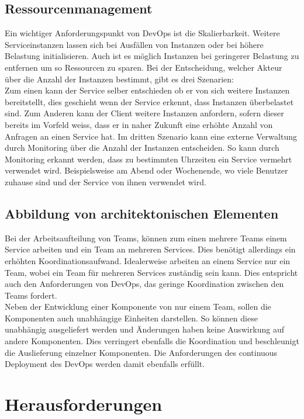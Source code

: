 \subsection{Ressourcenmanagement}

Ein wichtiger Anforderungspunkt von DevOps ist die Skalierbarkeit. Weitere Serviceinstanzen lassen sich bei Ausfällen von Instanzen oder bei höhere Belastung initialisieren. Auch ist es möglich Instanzen bei geringerer Belastung zu entfernen um so Ressourcen zu sparen. Bei der Entscheidung, welcher Akteur über die Anzahl der Instanzen bestimmt, gibt es drei Szenarien:\\
Zum einen kann der Service selber entschieden ob er von sich weitere Instanzen bereitstellt, dies geschieht wenn der Service erkennt, dass Instanzen überbelastet sind. Zum Anderen kann der Client weitere Instanzen anfordern, sofern dieser bereits im Vorfeld weiss, dass er in naher Zukunft eine erhöhte Anzahl von Anfragen an einen Service hat. Im dritten Szenario kann eine externe Verwaltung durch Monitoring über die Anzahl der Instanzen entscheiden. So kann durch Monitoring erkannt werden, dass zu bestimmten Uhrzeiten ein Service vermehrt verwendet wird. Beispielsweise am Abend oder Wochenende, wo viele Benutzer zuhause sind und der Service von ihnen verwendet wird. 

\subsection{Abbildung von architektonischen Elementen}

Bei der Arbeitsaufteilung von Teams, können zum einen mehrere Teams einem Service arbeiten und ein Team an mehreren Services. Dies benötigt allerdings ein erhöhten Koordinationsaufwand. Idealerweise arbeiten an einem Service nur ein Team, wobei ein Team für mehreren Services zuständig sein kann. Dies entspricht auch den Anforderungen von DevOps, das geringe Koordination zwischen den Teams fordert.\\

Neben der Entwicklung einer Komponente von nur einem Team, sollen die Komponenten auch unabhängige Einheiten darstellen. So können diese unabhängig ausgeliefert werden und Änderungen haben keine Auswirkung auf andere Komponenten. Dies verringert ebenfalls die Koordination und beschleunigt die Auslieferung einzelner Komponenten. Die Anforderungen des continuous Deployment des DevOps werden damit ebenfalls erfüllt. 


\section{Herausforderungen}

